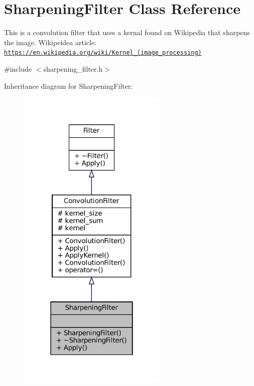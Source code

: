 \hypertarget{classSharpeningFilter}{}\section{Sharpening\+Filter Class Reference}
\label{classSharpeningFilter}


This is a convolution filter that uses a kernal found on Wikipedia that sharpens the image. Wikipeidea article\+: \href{https://en.wikipedia.org/wiki/Kernel_(image_processing)}{\tt https\+://en.\+wikipedia.\+org/wiki/\+Kernel\+\_\+(image\+\_\+processing)}  




{\ttfamily \#include $<$sharpening\+\_\+filter.\+h$>$}



Inheritance diagram for Sharpening\+Filter\+:\nopagebreak
\begin{figure}[H]
\begin{center}
\leavevmode
\includegraphics[width=202pt]{classSharpeningFilter__inherit__graph}
\end{center}
\end{figure}


